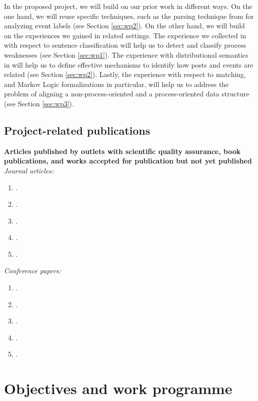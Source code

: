 \documentclass{scrartcl}
\begin{document}
In the proposed project, we will build on our prior work in different ways. On the one hand, we will reuse specific techniques, such as the parsing technique from \cite{leopold2019using} for analyzing event labels (see Section \ref{sec:wp2}). On the other hand, we will build on the experiences we gained in related settings. The experience we collected in \cite{van2017transforming} with respect to sentence classification will help us to detect and classify process weaknesses (see Section \ref{sec:wp1}). The experience with distributional semantics in \cite{leopold2015towards} will help us to define effective mechanisms to identify how posts and events are related (see Section \ref{sec:wp2}). Lastly, the experience with respect to matching, and Markov Logic formalizations in particular, will help us to address the problem of aligning a non-process-oriented and a process-oriented data structure (see Section \ref{sec:wp3}).  

\subsection{Project-related publications}

\noindent \textbf{Articles published by outlets with scientific quality assurance, book publications, and works accepted for publication but not yet published}\\[6pt]
\textit{Journal articles:}
\begin{enumerate}[leftmargin=*]
\item {}.
\item {}.
\item {}.
\item {}.
\item {}.
\end{enumerate}
\textit{Conference papers:}
\begin{enumerate}[resume,leftmargin=*]
\item {}.
\item {}.
\item {}.
\item {}.
\item {}.
\end{enumerate}

\section{Objectives and work programme}
\end{document}
